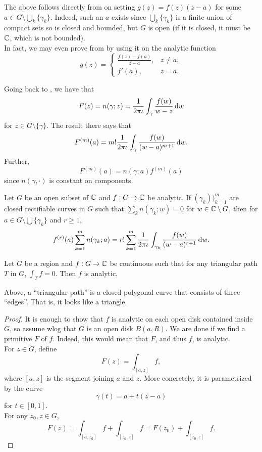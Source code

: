 	The above follows directly from  on setting $g(z) = f(z) (z-a)$ for some $a \in G \setminus \bigcup_k \{\gamma_k\}$. Indeed, such an $a$ exists since $\bigcup_k \{\gamma_k\}$ is a finite union of compact sets so is closed and bounded, but $G$ is open (if it is closed, it must be $\mathbb{C}$, which is not bounded).\\
	In fact, we may even prove  from  by using it on the analytic function
	\[
		g(z) =
		\begin{cases}
			\frac{f(z)-f(a)}{z-a}, & z \ne a, \\
			f'(a), & z = a.
		\end{cases}
	\]

	Going back to , we have that
	\[ F(z) = n(\gamma;z) = \frac{1}{2\pi\iota} \int_\gamma \frac{f(w)}{w-z} \dif w \]
	for $z \in G \setminus \{\gamma\}$. The result there says that
	\[ F^{(m)}(a) = m! \frac{1}{2\pi\iota} \int_\gamma \frac{f(w)}{(w-a)^{m+1}} \dif w. \]
	Further,
	\[ F^{(m)}(a) = n(\gamma;a) f^{(m)}(a) \]
	since $n(\gamma,\cdot)$ is constant on components.

	\begin{theorem}
		Let $G$ be an open subset of $\mathbb{C}$ and $f : G \to \mathbb{C}$ be analytic. If $(\gamma_k))_{k=1}^m$ are closed rectifiable curves in $G$ such that $\sum_k n(\gamma_k;w) = 0$ for $w \in \mathbb{C} \setminus G$, then for $a \in G \setminus \bigcup \{\gamma_k\}$ and $r \ge 1$,
		\[ f^{(r)}(a) \sum_{k=1}^m n(\gamma_k;a) = r! \sum_{k=1}^m \frac{1}{2\pi\iota} \int_{\gamma_k} \frac{f(w)}{(w-a)^{r+1}} \dif w. \]
	\end{theorem}

	\begin{ftheo}
		Let $G$ be a region and $f : G \to \mathbb{C}$ be continuous such that for any triangular path $T$ in $G$, $\int_T f = 0$. Then $f$ is analytic.
	\end{ftheo}
	Above, a ``triangular path'' is a closed polygonal curve that consists of three ``edges''. That is, it looks like a triangle.
	\begin{proof}
		It is enough to show that $f$ is analytic on each open disk contained inside $G$, so assume wlog that $G$ is an open disk $B(a,R)$.
		We are done if we find a primitive $F$ of $f$. Indeed, this would mean that $F$, and thus $f$, is analytic.\\
		For $z \in G$, define
		\[ F(z) = \int_{[a,z]} f  , \]
		where $[a,z]$ is the segment joining $a$ and $z$. More concretely, it is parametrized by the curve
		\[ \gamma(t) = a + t(z-a) \]
		for $t \in [0,1]$.\\
		For any $z_0, z \in G$,
		\[ F(z) = \int_{[a,z_0]} f + \int_{[z_0,z]} f = F(z_0) + \int_{[z_0,z]} f . \]
		
	\end{proof}